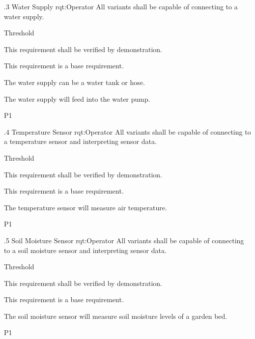 \ONERQMTVKPP
{\RqtNumberBase.3}
{Water Supply}
{rqt:Operator}
{All \ThisSys variants shall be capable of connecting to a water supply.}
{
	\item [All Phases] Threshold
}
{This requirement shall be verified by demonstration.}
{
	\item [N/A] This requirement is a base requirement.
}
{
  \item The water supply can be a water tank or hose.
  \item The water supply will feed into the water pump.
}
{P1}

\ONERQMTVKPP
{\RqtNumberBase.4}
{Temperature Sensor}
{rqt:Operator}
{All \ThisSys variants shall be capable of connecting to a temperature sensor and interpreting sensor data.}
{
	\item [All Phases] Threshold
}
{This requirement shall be verified by demonstration.}
{
	\item [N/A] This requirement is a base requirement.
}
{
  \item The temperature sensor will measure air temperature. 
}
{P1}

\ONERQMTVKPP
{\RqtNumberBase.5}
{Soil Moisture Sensor}
{rqt:Operator}
{All \ThisSys variants shall be capable of connecting to a soil moisture sensor and interpreting sensor data.}
{
	\item [All Phases] Threshold
}
{This requirement shall be verified by demonstration.}
{
	\item [N/A] This requirement is a base requirement.
}
{
  \item The soil moisture sensor will measure soil moisture levels of a garden bed. 
}
{P1}

